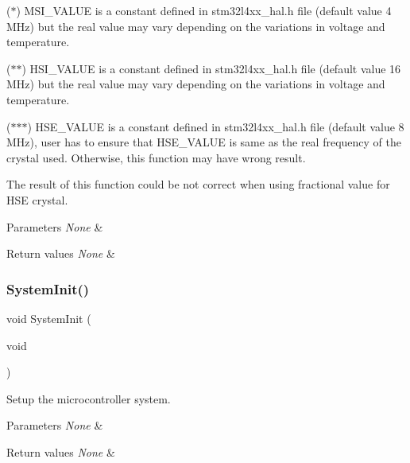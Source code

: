 ($\ast$) M\+S\+I\+\_\+\+V\+A\+L\+UE is a constant defined in stm32l4xx\+\_\+hal.\+h file (default value 4 M\+Hz) but the real value may vary depending on the variations in voltage and temperature.

($\ast$$\ast$) H\+S\+I\+\_\+\+V\+A\+L\+UE is a constant defined in stm32l4xx\+\_\+hal.\+h file (default value 16 M\+Hz) but the real value may vary depending on the variations in voltage and temperature.

($\ast$$\ast$$\ast$) H\+S\+E\+\_\+\+V\+A\+L\+UE is a constant defined in stm32l4xx\+\_\+hal.\+h file (default value 8 M\+Hz), user has to ensure that H\+S\+E\+\_\+\+V\+A\+L\+UE is same as the real frequency of the crystal used. Otherwise, this function may have wrong result.


\begin{DoxyItemize}
\item The result of this function could be not correct when using fractional value for H\+SE crystal.
\end{DoxyItemize}


\begin{DoxyParams}{Parameters}
{\em None} & \\
\hline
\end{DoxyParams}

\begin{DoxyRetVals}{Return values}
{\em None} & \\
\hline
\end{DoxyRetVals}
\mbox{\label{group___s_t_m32_l4xx___system___private___functions_ga93f514700ccf00d08dbdcff7f1224eb2}} 
\subsubsection{\texorpdfstring{System\+Init()}{SystemInit()}}
{\footnotesize\ttfamily void System\+Init (\begin{DoxyParamCaption}\item[{void}]{ }\end{DoxyParamCaption})}



Setup the microcontroller system. 


\begin{DoxyParams}{Parameters}
{\em None} & \\
\hline
\end{DoxyParams}

\begin{DoxyRetVals}{Return values}
{\em None} & \\
\hline
\end{DoxyRetVals}
